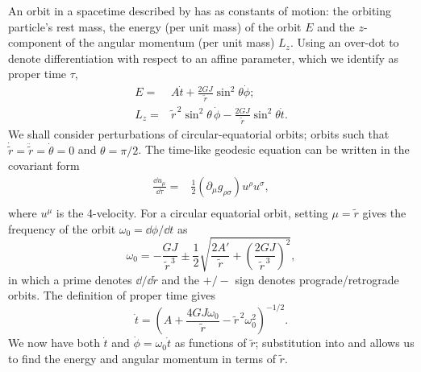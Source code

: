 An orbit in a spacetime described by  has as constants of motion: the orbiting particle's rest mass, the energy (per unit mass) of the orbit $E$ and the $z$-component of the angular momentum (per unit mass) $L_z$. Using an over-dot to denote differentiation with respect to an affine parameter, which we identify as proper time $\tau$,
\begin{align}
\label{eq:E_orbit}
E = {} & A\dot{t} + \frac{2GJ}{\widetilde{r}} \sin^2\theta\dot{\phi}; \\
L_z = {} & \widetilde{r}^{\,2}\sin^2\theta\, \dot{\phi} - \frac{2GJ}{\widetilde{r}} \sin^2\theta\dot{t} .
\label{eq:L_orbit}
\end{align}
We shall consider perturbations of circular-equatorial orbits; orbits such that $\dot{\widetilde{r}} = \ddot{\widetilde{r}} = \dot{\theta}= 0$ and $\theta = \pi/2$. The time-like geodesic equation can be written in the covariant form
\begin{align}
\frac{\dd u_\mu}{\dd \tau} = {} & \frac{1}{2} \left(\partial_\mu g_{\rho\sigma} \right) u^\rho u^\sigma,\\
 & \nonumber
\end{align}
where $u^\mu$ is the 4-velocity. For a circular equatorial orbit, setting $\mu = \widetilde{r}$ gives the frequency of the orbit $\omega_0 = \dd\phi/\dd t$ as
\begin{equation}
\omega_0 = -\frac{GJ}{\widetilde{r}^{\,3}} \pm \frac{1}{2} \sqrt{\frac{2A'}{\widetilde{r}} + \left(\frac{2GJ}{\widetilde{r}^{\,3}}\right)^2},
\label{eq:omz}
\end{equation}
in which a prime denotes $\dd/\dd\widetilde{r}$ and the $+/-$ sign denotes prograde/retrograde orbits. The definition of proper time gives
\begin{equation}
\dot{t} = \left(A + \frac{4GJ\omega_0}{\widetilde{r}} - \widetilde{r}^{\,2}\omega_0^2 \right)^{-1/2}.
\end{equation}
We now have both $\dot{t}$ and $\dot{\phi} = \omega_0\dot{t}$ as functions of $\widetilde{r}$; substitution into  and  allows us to find the energy and angular momentum in terms of $\widetilde{r}$.

